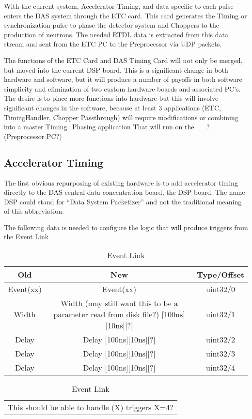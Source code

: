 With the current system, Accelerator Timing, and data specific to each pulse enters the DAS system through the ETC card.  This card generates the Timing or synchronization pulse to phase the detector system and Choppers to the production of neutrons.  The needed RTDL data is extracted from this data stream and sent from the ETC PC to the Preprocessor via UDP packets.  

The functions of the ETC Card and DAS Timing Card will not only be merged, but moved into the current DSP board.  This is a significant change in both hardware and software, but it will produce a number of payoffs in both software simplicity and elimination of two custom hardware boards and associated PC’s.  The desire is to place more functions into hardware but this will involve significant changes in the software, because at least 3 applications (ETC, TimingHandler, Chopper Passthrough) will require modifications or combining into a master Timing\_Phasing application That will run on the \_\_?\_\_ (Preprocessor PC?)

\subsection {Accelerator Timing}
The first obvious repurposing of existing hardware is to add accelerator timing directly to the DAS central data concentration board, the DSP board.   The name DSP could stand for ``Data System Packetizer'' and not the traditional meaning of this abbreviation.  

The following data is needed to configure the logic that will produce triggers from the Event Link


\begin{table}[h]
  \begin{center}
    \begin{tabular}{c | c | c}
    Old & New & Type/Offset \\
    \hline
    Event(xx) & Event(xx) & uint32/0 \\
    Width & Width (may still want this to be a parameter read from disk file?) [100ns][10ns][?] & uint32/1 \\
    Delay & Delay [100ns][10ns][?] & uint32/2 \\
    Delay & Delay [100ns][10ns][?] & uint32/3 \\
    Delay & Delay [100ns][10ns][?] & uint32/4 \\
    \end{tabular}
    \begin{tabular} { c }
    This should be able to handle (X) triggers X=4?\\
    \end{tabular}
  \end{center}
  \caption {Event Link}
  \label{table:Event_Link}
\end{table}


